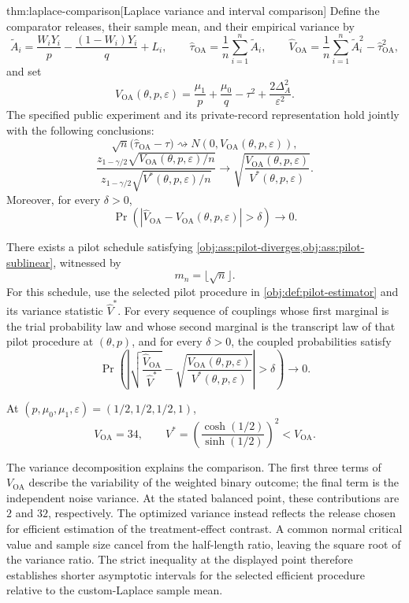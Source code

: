 \documentclass[11pt]{article}
\begin{document}
\begin{theoremv}{thm:laplace-comparison}[Laplace variance and interval comparison]
Define the comparator releases, their sample mean, and their empirical variance by
\[
\widetilde A_i
=\frac{W_iY_i}{p}-\frac{(1-W_i)Y_i}{q}+L_i,
\qquad
\widehat\tau_{\mathrm{OA}}
=\frac1n\sum_{i=1}^n\widetilde A_i,
\qquad
\widehat V_{\mathrm{OA}}
=\frac1n\sum_{i=1}^n\widetilde A_i^2
-\widehat\tau_{\mathrm{OA}}^2,
\]
and set
\[
V_{\mathrm{OA}}(\theta,p,\varepsilon)
=\frac{\mu_1}{p}+\frac{\mu_0}{q}-\tau^2
+\frac{2\Delta_A^2}{\varepsilon^2}.
\]
The specified public experiment and its private-record representation hold jointly with the following conclusions:
\[
\sqrt n\bigl(\widehat\tau_{\mathrm{OA}}-\tau\bigr)
\rightsquigarrow
N\!\left(0,V_{\mathrm{OA}}(\theta,p,\varepsilon)\right),
\]
\[
\frac{z_{1-\gamma/2}\sqrt{V_{\mathrm{OA}}(\theta,p,\varepsilon)/n}}
     {z_{1-\gamma/2}\sqrt{V^*(\theta,p,\varepsilon)/n}}
\longrightarrow
\sqrt{\frac{V_{\mathrm{OA}}(\theta,p,\varepsilon)}
           {V^*(\theta,p,\varepsilon)}}.
\]
Moreover, for every \(\delta>0\),
\[
\Pr\!\left(
\left|\widehat V_{\mathrm{OA}}
      -V_{\mathrm{OA}}(\theta,p,\varepsilon)\right|>\delta
\right)\longrightarrow0.
\]

There exists a pilot schedule satisfying
\cref{obj:ass:pilot-diverges,obj:ass:pilot-sublinear}, witnessed by
\[
m_n=\lfloor\sqrt n\rfloor.
\]
For this schedule, use the selected pilot procedure in
\cref{obj:def:pilot-estimator} and its variance statistic \(\widehat V^*\).
For every sequence of couplings whose first marginal is the trial probability law and whose second marginal is the transcript law of that pilot procedure at \((\theta,p)\), and for every \(\delta>0\), the coupled probabilities satisfy
\[
\Pr\!\left(
\left|
\sqrt{\frac{\widehat V_{\mathrm{OA}}}{\widehat V^*}}
-\sqrt{\frac{V_{\mathrm{OA}}(\theta,p,\varepsilon)}
             {V^*(\theta,p,\varepsilon)}}
\right|>\delta
\right)\longrightarrow0.
\]

At \((p,\mu_0,\mu_1,\varepsilon)=(1/2,1/2,1/2,1)\),
\[
V_{\mathrm{OA}}=34,
\qquad
V^*=\left(\frac{\cosh(1/2)}{\sinh(1/2)}\right)^2
< V_{\mathrm{OA}}.
\]
\end{theoremv}

The variance decomposition explains the comparison. The first three terms of \(V_{\mathrm{OA}}\) describe the variability of the weighted binary outcome; the final term is the independent noise variance. At the stated balanced point, these contributions are \(2\) and \(32\), respectively. The optimized variance instead reflects the release chosen for efficient estimation of the treatment-effect contrast. A common normal critical value  and sample size cancel from the half-length ratio, leaving the square root of the variance ratio. The strict inequality at the displayed point therefore establishes shorter asymptotic intervals for the selected efficient procedure relative to the custom-Laplace sample mean.
\end{document}

